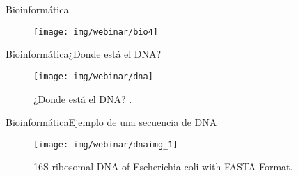 \documentclass[10pt]{beamer}
\newcommand{\1}{
        	\setbeamertemplate{background}{
        		\texttt{[image: img/1]}
        		\tikz[overlay] \fill[fill opacity=0.75,fill=white] (0,0) rectangle (-\paperwidth,\paperheight);
        	}
}
\begin{document}
\begin{frame}{Bioinformática}
	\begin{figure}[]
		\centering
		\texttt{[image: img/webinar/bio4]}
	\end{figure}
\end{frame}


\begin{frame}{Bioinformática}{¿Donde está el DNA?}
	\begin{figure}[]
		\centering
		\texttt{[image: img/webinar/dna]}
		\caption{¿Donde está el DNA? \cite{NCIdictionary2022}.}
	\end{figure}
\end{frame}

\begin{frame}{Bioinformática}{Ejemplo de una secuencia de DNA}
	\begin{figure}[]
		\centering
		\texttt{[image: img/webinar/dnaimg\_1]}
		\caption{16S ribosomal DNA of Escherichia coli with FASTA Format.}
	\end{figure}
\end{frame}
\end{document}
